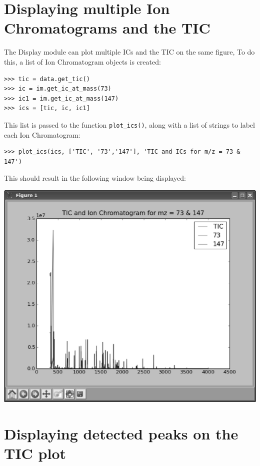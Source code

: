 \section{Displaying multiple Ion Chromatograms and the TIC}



The Display module can plot multiple ICs and the TIC on the same figure, 
To do this, a list of Ion Chromatogram objects is created:

\begin{verbatim}
>>> tic = data.get_tic()
>>> ic = im.get_ic_at_mass(73)
>>> ic1 = im.get_ic_at_mass(147)
>>> ics = [tic, ic, ic1]
\end{verbatim}

This list is passed to the 
function {\tt plot\_ics()}, along with a list of strings to label each 
Ion Chromatogram:

\begin{verbatim}
>>> plot_ics(ics, ['TIC', '73','147'], 'TIC and ICs for m/z = 73 & 147')
\end{verbatim}

This should result in the following window being displayed:

\begin{center}
\includegraphics[scale=0.33]{graphics/test-70b.eps}
\end{center}


\section{Displaying detected peaks on the TIC plot}

